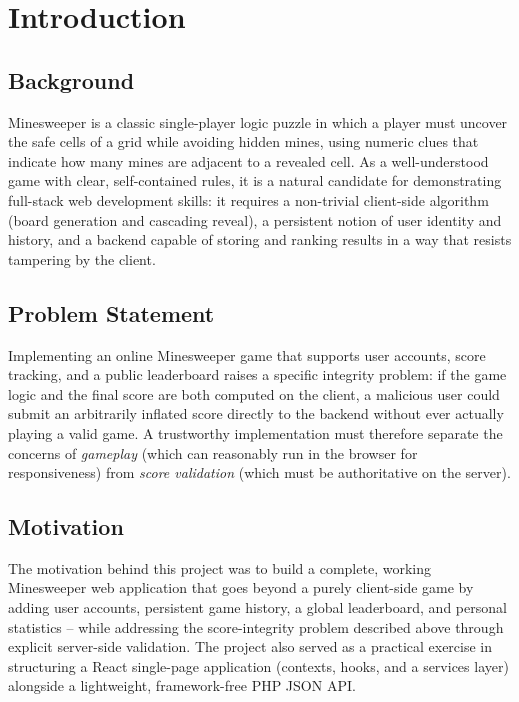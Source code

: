 \chapter{Introduction}
\label{ch:introduction}

\section{Background}
Minesweeper is a classic single-player logic puzzle in which a player must
uncover the safe cells of a grid while avoiding hidden mines, using numeric
clues that indicate how many mines are adjacent to a revealed cell. As a
well-understood game with clear, self-contained rules, it is a natural
candidate for demonstrating full-stack web development skills: it requires a
non-trivial client-side algorithm (board generation and cascading reveal), a
persistent notion of user identity and history, and a backend capable of
storing and ranking results in a way that resists tampering by the client.

\section{Problem Statement}
Implementing an online Minesweeper game that supports user accounts, score
tracking, and a public leaderboard raises a specific integrity problem: if the
game logic and the final score are both computed on the client, a malicious
user could submit an arbitrarily inflated score directly to the backend
without ever actually playing a valid game. A trustworthy implementation must
therefore separate the concerns of \emph{gameplay} (which can reasonably run
in the browser for responsiveness) from \emph{score validation} (which must be
authoritative on the server).

\section{Motivation}
The motivation behind this project was to build a complete, working
Minesweeper web application that goes beyond a purely client-side game by
adding user accounts, persistent game history, a global leaderboard, and
personal statistics -- while addressing the score-integrity problem described
above through explicit server-side validation. The project also served as a
practical exercise in structuring a React single-page application (contexts,
hooks, and a services layer) alongside a lightweight, framework-free PHP
JSON API.

